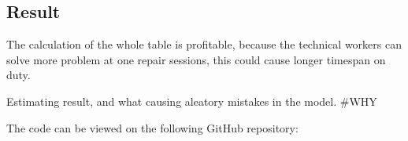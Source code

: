 	\subsection{Result}
The calculation of the whole table is profitable, because the technical workers can solve more problem at one repair sessions, this could cause longer timespan on duty.

Estimating result, and what causing aleatory mistakes in the model. 
\#WHY

The code can be viewed on the following GitHub repository:\cite{GitHub_FP_RUL}